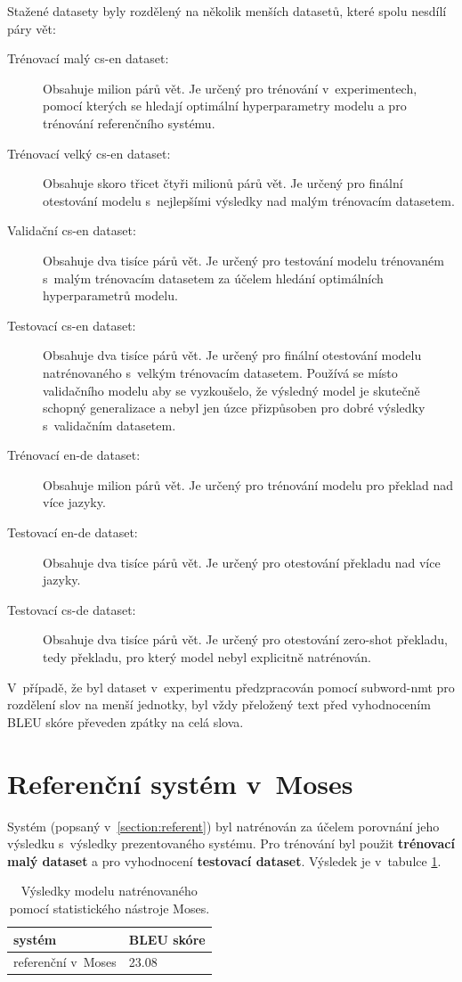 Stažené datasety byly rozdělený na několik menších datasetů, které spolu nesdílí páry vět:
\begin{description}
  \item[Trénovací malý cs-en dataset:] Obsahuje milion párů vět. Je určený pro trénování v~experimentech, pomocí kterých se hledají optimální hyperparametry modelu a pro trénování referenčního systému.
  \item[Trénovací velký cs-en dataset:] Obsahuje skoro třicet čtyři milionů párů vět. Je určený pro finální otestování modelu s~nejlepšími výsledky nad malým trénovacím datasetem.
  \item[Validační cs-en dataset:] Obsahuje dva tisíce párů vět. Je určený pro testování modelu trénovaném s~malým trénovacím datasetem za účelem hledání optimálních hyperparametrů modelu.
  \item[Testovací cs-en dataset:] Obsahuje dva tisíce párů vět. Je určený pro finální otestování modelu natrénovaného s~velkým trénovacím datasetem. Používá se místo validačního modelu aby se vyzkoušelo, že výsledný model je skutečně schopný generalizace a nebyl jen úzce přizpůsoben pro dobré výsledky s~validačním datasetem.
  \item[Trénovací en-de dataset:] Obsahuje milion párů vět. Je určený pro trénování modelu pro překlad nad více jazyky.
  \item[Testovací en-de dataset:] Obsahuje dva tisíce párů vět. Je určený pro otestování překladu nad více jazyky.
  \item[Testovací cs-de dataset:] Obsahuje dva tisíce párů vět. Je určený pro otestování zero-shot překladu, tedy překladu, pro který model nebyl explicitně natrénován.
\end{description}

V~případě, že byl dataset v~experimentu předzpracován pomocí subword-nmt pro rozdělení slov na menší jednotky, byl vždy přeložený text před vyhodnocením BLEU skóre převeden zpátky na celá slova.

\section{Referenční systém v~Moses}
Systém (popsaný v~\ref{section:referent}) byl natrénován za účelem porovnání jeho výsledku s~výsledky prezentovaného systému. Pro trénování byl použit \textbf{trénovací malý dataset} a pro vyhodnocení \textbf{testovací dataset}. Výsledek je v~tabulce \ref{table:referent}.

\begin{table}[H]
    \begin{center}
        \begin{tabular}{ll}
          \toprule
          systém & BLEU skóre  \\
          \midrule
          referenční v~Moses & 23.08\\
          \bottomrule
        \end{tabular}
    \end{center}
	\caption{Výsledky modelu natrénovaného pomocí statistického nástroje Moses.}
	\label{table:referent}
\end{table}

